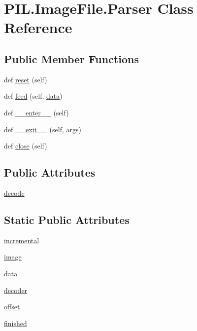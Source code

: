 \hypertarget{classPIL_1_1ImageFile_1_1Parser}{}\section{P\+I\+L.\+Image\+File.\+Parser Class Reference}
\label{classPIL_1_1ImageFile_1_1Parser}
\subsection*{Public Member Functions}
\begin{DoxyCompactItemize}
\item 
def \hyperlink{classPIL_1_1ImageFile_1_1Parser_abc12bc5d87351871fb433ad3e559ae0f}{reset} (self)
\item 
def \hyperlink{classPIL_1_1ImageFile_1_1Parser_a8a952f7aa1f42012d193c1ec4060122f}{feed} (self, \hyperlink{classPIL_1_1ImageFile_1_1Parser_add4132ff0d3328556dcb114e4c81c0e2}{data})
\item 
def \hyperlink{classPIL_1_1ImageFile_1_1Parser_af6cba5472565f60a5db6cee8c212150a}{\+\_\+\+\_\+enter\+\_\+\+\_\+} (self)
\item 
def \hyperlink{classPIL_1_1ImageFile_1_1Parser_a566b4ab17375b309cde5ad58fb23b560}{\+\_\+\+\_\+exit\+\_\+\+\_\+} (self, args)
\item 
def \hyperlink{classPIL_1_1ImageFile_1_1Parser_ada4551727462e59682d4864d40f7891a}{close} (self)
\end{DoxyCompactItemize}
\subsection*{Public Attributes}
\begin{DoxyCompactItemize}
\item 
\hyperlink{classPIL_1_1ImageFile_1_1Parser_aef65701dd84749028abfed78ac849341}{decode}
\end{DoxyCompactItemize}
\subsection*{Static Public Attributes}
\begin{DoxyCompactItemize}
\item 
\hyperlink{classPIL_1_1ImageFile_1_1Parser_ad435880b059abeecd752c15ac172c005}{incremental}
\item 
\hyperlink{classPIL_1_1ImageFile_1_1Parser_a443129a675171114fe5c1b2d5bbe0f12}{image}
\item 
\hyperlink{classPIL_1_1ImageFile_1_1Parser_add4132ff0d3328556dcb114e4c81c0e2}{data}
\item 
\hyperlink{classPIL_1_1ImageFile_1_1Parser_a4306d6c8e385be45e7318647dc7ad973}{decoder}
\item 
\hyperlink{classPIL_1_1ImageFile_1_1Parser_a76a1ab96a2709adabda5c25e78267e82}{offset}
\item 
\hyperlink{classPIL_1_1ImageFile_1_1Parser_a94ebfd7391331c619aa35aae240c2bd9}{finished}
\end{DoxyCompactItemize}


